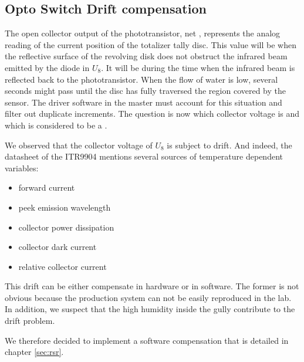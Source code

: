 



\subsection{Opto Switch Drift compensation}
\label{sec:osd}
The open collector output of the phototransistor, net , represents the analog reading of
the current position of the totalizer tally disc.
This value will be  when the reflective surface of the revolving disk does not obstruct the infrared beam emitted by the
diode in $U_8$. It will be  during the time when the infrared beam is reflected back to the phototransistor.
When the flow of water is low, several seconds might pass until the disc has fully traversed the region covered by the sensor.
The driver software in the master must account for this situation and filter out duplicate increments.
The question is now  which collector voltage is  and which is considered to be a .

We observed that the collector voltage of $U_8$ is subject to drift. And indeed, the datasheet of the ITR9904 mentions several sources
of temperature dependent variables:

\begin{itemize}
    \item forward current
    \item peek emission wavelength
    \item collector power dissipation
    \item collector dark current
    \item relative collector current
\end{itemize}


This drift can be either compensate in hardware or in software. The former is not obvious because the production system can not be
easily reproduced in the lab. In addition, we suspect that the high humidity inside the gully contribute to the drift problem.

We therefore decided to implement a software compensation that is detailed in chapter \ref{sec:rsr}.
